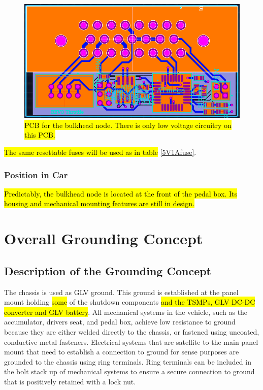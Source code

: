 \documentclass{article}
\DeclareRobustCommand{\hlr}[1]{{\sethlcolor{red}\hl{#1}}}
\begin{document}
            \begin{figure}[H]
            \centering
            \includegraphics[width = 0.8 \textwidth]{throttlePCB}
            \caption{\hlr{PCB for the bulkhead node. There is only low voltage circuitry on this PCB.}}
            \label{throttlePCB}
            \end{figure}

            \hlr{The same resettable fuses will be used as in table} \ref{5V1Afuse}.

            \subsubsection{Position in Car}

            \hlr{Predictably, the bulkhead node is located at the front of the pedal box. Its housing and mechanical mounting features are still in design.}

\newpage

\section{Overall Grounding Concept}

    \subsection{Description of the Grounding Concept}


        The chassis is used as GLV ground. This ground is established at the panel mount holding \hlr{some} of the shutdown components \hlr{and the TSMPs, GLV DC-DC converter and GLV battery}. All mechanical systems in the vehicle, such as the accumulator, drivers seat, and pedal box, achieve low resistance to ground because they are either welded directly to the chassis, or fastened using uncoated, conductive metal fasteners. Electrical systems that are satellite to the main panel mount that need to establish a connection to ground for sense purposes are grounded to the chassis using ring terminals. Ring terminals can be included in the bolt stack up of mechanical systems to ensure a secure connection to ground that is positively retained with a lock nut.
\end{document}
